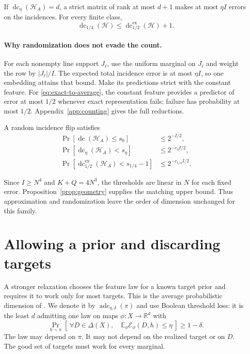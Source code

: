\documentclass[11pt,letterpaper,pmlr,twoside]{jmlr}
\newcommand{\Hc}{\mathcal H}
\newcommand{\E}{\mathbb E}
\newcommand{\R}{\mathbb R}
\newcommand{\dc}{\operatorname{dc}}
\newcommand{\edc}{\operatorname{dc}^{\mathrm{ex}}_{1/2}}
\newcommand{\adc}{\operatorname{adc}}
\begin{document}
\begin{lemma}\label{lem:prob-reduction}
If $\dc_\eta(\Hc_A)=d$, a strict matrix of rank at most $d+1$ makes at most $\eta I$ errors on the incidences. For every finite class,
\begin{equation}
 \dc_{1/4}(\Hc)\le\edc(\Hc)+1.
 \label{eq:exact-to-average}
\end{equation}
\end{lemma}

\paragraph{Why randomization does not evade the count.}
For each nonempty line support $J_\ell$, use the uniform marginal on $J_\ell$ and weight the row by $|J_\ell|/I$. The expected total incidence error is at most $\eta I$, so one embedding attains that bound. Make its predictions strict with the constant feature. For \eqref{eq:exact-to-average}, the constant feature provides a predictor of error at most $1/2$ whenever exact representation fails; failure has probability at most $1/2$. Appendix~\ref{app:counting} gives the full reductions.

\begin{theorem}\label{thm:dimensions}
A random incidence flip satisfies
\begin{align}
 \Pr[\dc(\Hc_A)\le s_0]&\le2^{-I/2},\label{eq:ordinaryprob}\\
 \Pr[\dc_\eta(\Hc_A)<s_\eta]&\le2^{-c_\eta I/2},\label{eq:averageprob}\\
 \Pr[\edc(\Hc_A)<s_{1/4}-1]&\le2^{-c_{1/4}I/2}.
 \label{eq:exactprob-bound}
\end{align}
\end{theorem}

Since $I\ge N^4$ and $K+Q=4N^3$, the thresholds are linear in $N$ for each fixed error. Proposition~\ref{prop:geometry} supplies the matching upper bound. Thus approximation and randomization leave the order of dimension unchanged for this family.

\section{Allowing a prior and discarding targets}\label{sec:prior}
A stronger relaxation chooses the feature law for a known target prior and requires it to work only for most targets. This is the average probabilistic dimension of \citet[Definition~3.2]{KM25}. We denote it by $\adc_{\eta,\delta}(\pi)$ and use Boolean threshold loss: it is the least $d$ admitting one law on maps $\phi:X\to\R^d$ with
\begin{equation}
 \Pr_{h\sim\pi}\left[\ \forall D\in\Delta(X),\quad
       \E_\phi\mathcal E_\phi(D,h)\le\eta\ \right]\ge1-\delta.
 \label{eq:adcdef}
\end{equation}
The law may depend on $\pi$. It may not depend on the realized target or on $D$. The good set of targets must work for every marginal.
\end{document}

